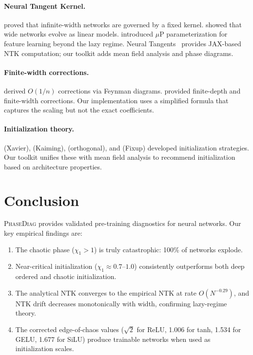 \documentclass[10pt]{article}
\theoremstyle{definition}
\begin{document}
\paragraph{Neural Tangent Kernel.}
\citet{jacot2018neural} proved that infinite-width networks are governed by a fixed kernel.
\citet{lee2019wide} showed that wide networks evolve as linear models.
\citet{yang2021tensor} introduced $\mu$P parameterization for feature learning beyond the lazy regime.
Neural Tangents~\citep{novak2019neural} provides JAX-based NTK computation; our toolkit adds mean field analysis and phase diagrams.

\paragraph{Finite-width corrections.}
\citet{dyer2020asymptotics} derived $O(1/n)$ corrections via Feynman diagrams.
\citet{hanin2020finite} provided finite-depth and finite-width corrections.
Our implementation uses a simplified formula that captures the scaling but not the exact coefficients.

\paragraph{Initialization theory.}
\citet{glorot2010understanding} (Xavier), \citet{he2015delving} (Kaiming), \citet{saxe2014exact} (orthogonal), and \citet{zhang2019fixup} (Fixup) developed initialization strategies.
Our toolkit unifies these with mean field analysis to recommend initialization based on architecture properties.

\section{Conclusion}

\textsc{PhaseDiag} provides validated pre-training diagnostics for neural networks.
Our key empirical findings are:
\begin{enumerate}[nosep]
  \item The chaotic phase ($\chi_1 > 1$) is truly catastrophic: 100\% of networks explode.
  \item Near-critical initialization ($\chi_1 \approx 0.7$--$1.0$) consistently outperforms both deep ordered and chaotic initialization.
  \item The analytical NTK converges to the empirical NTK at rate $O(N^{-0.29})$, and NTK drift decreases monotonically with width, confirming lazy-regime theory.
  \item The corrected edge-of-chaos values ($\sqrt{2}$ for ReLU, 1.006 for tanh, 1.534 for GELU, 1.677 for SiLU) produce trainable networks when used as initialization scales.
\end{enumerate}
\end{document}
